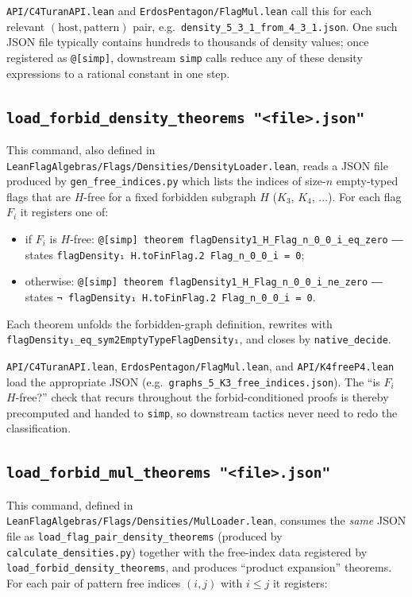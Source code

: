 \documentclass[11pt]{article}
\begin{document}
\texttt{API/C4TuranAPI.lean} and \texttt{ErdosPentagon/FlagMul.lean}
call this for each relevant $(\text{host},\text{pattern})$ pair, e.g.\
\texttt{density\_5\_3\_1\_from\_4\_3\_1.json}. One such JSON file
typically contains hundreds to thousands of density values; once
registered as \texttt{@[simp]}, downstream \texttt{simp} calls reduce
any of these density expressions to a rational constant in one step.

\subsection{\texttt{load\_forbid\_density\_theorems "<file>.json"}}

This command, also defined in
\texttt{LeanFlagAlgebras/Flags/Densities/DensityLoader.lean}, reads a
JSON file produced by \texttt{gen\_free\_indices.py} which lists the
indices of size-$n$ empty-typed flags that are $H$-free for a fixed
forbidden subgraph $H$ ($K_3$, $K_4$, $\ldots$). For each flag $F_i$ it
registers one of:

\begin{itemize}
  \item if $F_i$ is $H$-free:
    \texttt{@[simp] theorem flagDensity1\_H\_Flag\_n\_0\_0\_i\_eq\_zero}
    ― states \texttt{flagDensity₁ H.toFinFlag.2 Flag\_n\_0\_0\_i = 0};
  \item otherwise:
    \texttt{@[simp] theorem flagDensity1\_H\_Flag\_n\_0\_0\_i\_ne\_zero}
    ― states \texttt{¬ flagDensity₁ H.toFinFlag.2 Flag\_n\_0\_0\_i = 0}.
\end{itemize}

Each theorem unfolds the forbidden-graph definition, rewrites with
\texttt{flagDensity₁\_eq\_sym2EmptyTypeFlagDensity₁}, and closes by
\texttt{native\_decide}.

\texttt{API/C4TuranAPI.lean}, \texttt{ErdosPentagon/FlagMul.lean},
and \texttt{API/K4freeP4.lean} load the appropriate JSON (e.g.\
\texttt{graphs\_5\_K3\_free\_indices.json}). The ``is $F_i$
$H$-free?'' check that recurs throughout the forbid-conditioned
proofs is thereby precomputed and handed to \texttt{simp}, so
downstream tactics never need to redo the classification.

\subsection{\texttt{load\_forbid\_mul\_theorems "<file>.json"}}

This command, defined in
\texttt{LeanFlagAlgebras/Flags/Densities/MulLoader.lean}, consumes the
\emph{same} JSON file as \texttt{load\_flag\_pair\_density\_theorems}
(produced by \texttt{calculate\_densities.py}) together with the
free-index data registered by \texttt{load\_forbid\_density\_theorems},
and produces ``product expansion'' theorems. For each pair of pattern
free indices $(i,j)$ with $i \le j$ it registers:
\end{document}
